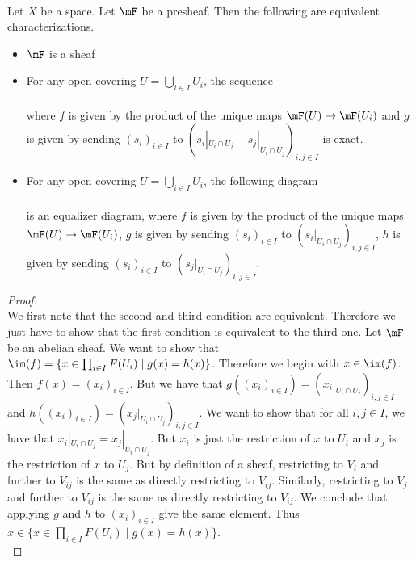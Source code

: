 \documentclass[a4paper]{article}
\begin{document}
\begin{prp}{}{}\\
Let $X$ be a space. Let $\mF$ be a presheaf. Then the following are equivalent characterizations. 
\begin{itemize}
\item $\mF$ is a sheaf
\item For any open covering $U=\bigcup_{i\in I}U_i$, the sequence \\
\\
where $f$ is given by the product of the unique maps $\mF(U)\to\mF(U_i)$ and $g$ is given by sending $(s_i)_{i\in I}$ to $(s_i|_{U_i\cap U_j}-s_j|_{U_i\cap U_j})_{i,j\in I}$ is exact. 
\item For any open covering $U=\bigcup_{i\in I}U_i$, the following diagram \\
\\
is an equalizer diagram, where $f$ is given by the product of the unique maps $\mF(U)\to\mF(U_i)$, $g$ is given by sending $(s_i)_{i\in I}$ to $(s_i|_{U_i\cap U_j})_{i,j\in I}$, $h$ is given by sending $(s_i)_{i\in I}$ to $(s_j|_{U_i\cap U_j})_{i,j\in I}$. 
\end{itemize} 
\begin{proof}~\\
We first note that the second and third condition are equivalent. Therefore we just have to show that the first condition is equivalent to the third one. Let $\mF$ be an abelian sheaf. We want to show that $\im(f)=\{x\in\prod_{i\in I}F(U_i)\;|\;g(x)=h(x)\}$. Therefore we begin with $x\in\im(f)$. Then $f(x)=(x_i)_{i\in I}$. But we have that $g((x_i)_{i\in I})=(x_i|_{U_i\cap U_j})_{i,j\in I}$ and $h((x_i)_{i\in I})=(x_j|_{U_i\cap U_j})_{i,j\in I}$. We want to show that for all $i,j\in I$, we have that $x_i|_{U_i\cap U_j}=x_j|_{U_i\cap U_j}$. But $x_i$ is just the restriction of $x$ to $U_i$ and $x_j$ is the restriction of $x$ to $U_j$. But by definition of a sheaf, restricting to $V_i$ and further to $V_{ij}$ is the same as directly restricting to $V_{ij}$. Similarly, restricting to $V_j$ and further to $V_{ij}$ is the same as directly restricting to $V_{ij}$. We conclude that applying $g$ and $h$ to $(x_i)_{i\in I}$ give the same element. Thus $x\in\{x\in\prod_{i\in I}F(U_i)\;|\;g(x)=h(x)\}$. \\


\end{proof}
\end{prp}
\end{document}

